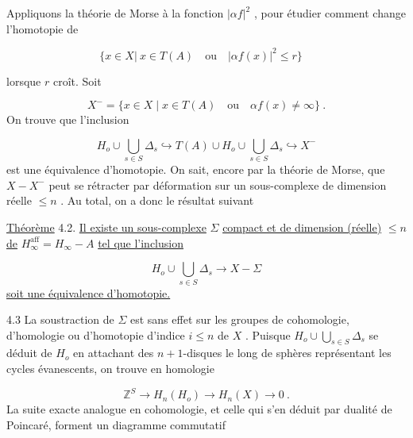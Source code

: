 Appliquons la théorie de Morse à la fonction $|\alpha f|^2$ , pour étudier comment change l'homotopie de

\begin{equation*}
\{x \in X| \ x \in T(A) \quad \mathrm{ou} \quad |\alpha f(x)|^2 \leq r \} \quad 
\end{equation*}


 lorsque $r$ croît. Soit

\begin{equation*}
X^- = \{x \in X \mid x \in T(A) \quad \mathrm{ou} \quad \alpha f(x) \neq \infty \} \ .
\end{equation*}
On trouve que l'inclusion

\begin{equation*}
H_o \cup \bigcup_{s \in S} \Delta_s \hookrightarrow T(A) \cup H_o \cup \bigcup_{s \in S} \Delta_s \hookrightarrow X^-
\end{equation*}
est une équivalence d'homotopie. On sait, encore par la théorie de Morse, que $X - X^-$ peut se rétracter par déformation sur un sous-complexe de dimension réelle $\leq n$ . Au total, on a donc le résultat suivant

\underline{Théorème} 4.2. \quad \underline{Il existe un sous-complexe} $\Sigma$ \underline{compact et de dimension (réelle)} $\leq n$ \underline{de} $H_\infty^{\mathrm{aff}} = H_\infty - A$ \underline{tel que l'inclusion}

\begin{equation*}
H_o \cup \bigcup_{s \in S} \Delta_s \longrightarrow X - \Sigma
\end{equation*}
\underline{soit une équivalence d'homotopie.}

4.3 \quad La soustraction de $\Sigma$ est sans effet sur les groupes de cohomologie, d'homologie ou d'homotopie d'indice $i \leq n$ de $X$ . Puisque $H_o \cup \bigcup_{s \in S} \Delta_s$ se déduit de $H_o$ en attachant des $n+1$-disques le long de sphères représentant les cycles évanescents, on trouve en homologie

\begin{equation*}
\mathbb{Z}^S \longrightarrow H_n(H_o) \longrightarrow H_n(X) \longrightarrow 0 \ .
\end{equation*}
La suite exacte analogue en cohomologie, et celle qui s'en déduit par dualité de Poincaré, forment un diagramme commutatif

